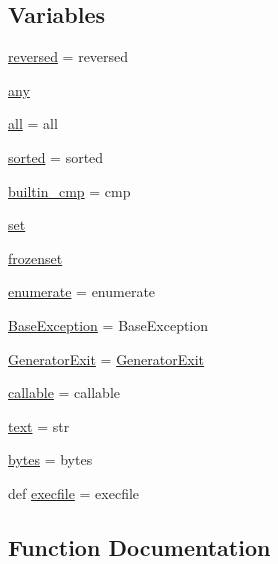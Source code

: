 \subsection*{Variables}
\begin{DoxyCompactItemize}
\item 
\hyperlink{namespacepy_1_1__builtin_a75ae83d46de2fca162578dc7d357a921}{reversed} = reversed
\item 
\hyperlink{namespacepy_1_1__builtin_a2c6699e227d28c411f49d5d6f8e260ce}{any}
\item 
\hyperlink{namespacepy_1_1__builtin_ac5441a4a5f24ac5b9c8b9924cf745830}{all} = all
\item 
\hyperlink{namespacepy_1_1__builtin_a177c70aafc7f8588fbb0ac6b0f2fe2c8}{sorted} = sorted
\item 
\hyperlink{namespacepy_1_1__builtin_a3c64487474b70cb204923e1bead0345c}{builtin\+\_\+cmp} = cmp
\item 
\hyperlink{namespacepy_1_1__builtin_a2b2dc1c23346592e3b7dd26be6125f6c}{set}
\item 
\hyperlink{namespacepy_1_1__builtin_abaee473d3ac8229db31e234fe0ff82dc}{frozenset}
\item 
\hyperlink{namespacepy_1_1__builtin_a738935bd44666db26cf67ff3f8c6b164}{enumerate} = enumerate
\item 
\hyperlink{namespacepy_1_1__builtin_aff3dc671874dc3bb4f26775130051a2b}{Base\+Exception} = Base\+Exception
\item 
\hyperlink{namespacepy_1_1__builtin_a0b23cab70145127e7c5467a91d993c48}{Generator\+Exit} = \hyperlink{classpy_1_1__builtin_1_1_generator_exit}{Generator\+Exit}
\item 
\hyperlink{namespacepy_1_1__builtin_a0e2d083a37cd756cd996b9645203730a}{callable} = callable
\item 
\hyperlink{namespacepy_1_1__builtin_a7a68bf960ffe1fb1ab7ea4255802da70}{text} = str
\item 
\hyperlink{namespacepy_1_1__builtin_a3adff19b7bb18d7f56b9f55409617c4b}{bytes} = bytes
\item 
def \hyperlink{namespacepy_1_1__builtin_a1d016d0ce38e954594ca26c4fc76eb92}{execfile} = execfile
\end{DoxyCompactItemize}


\subsection{Function Documentation}
\mbox{\label{namespacepy_1_1__builtin_a2070db5def6955711ebee00840d3a0cd}} 
